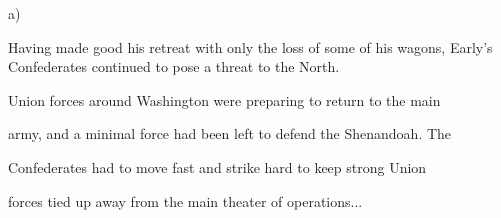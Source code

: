 a)

Having made good his retreat with only the loss of some of his wagons, Early's Confederates continued to pose a threat to the North.

\begin{scenariodata}
Union forces around Washington were preparing to return to the main\\
\end{scenariodata}

army, and a minimal force had been left to defend the Shenandoah. The

\begin{scenariodata}
Confederates had to move fast and strike hard to keep strong Union\\
\end{scenariodata}

forces tied up away from the main theater of operations...

